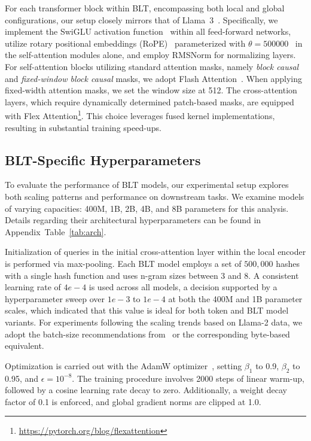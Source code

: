 For each transformer block within {\textsc BLT}, encompassing both local and global configurations, our setup closely mirrors that of Llama~3~\citep{dubey2024llama}. Specifically, we implement the SwiGLU activation function~\citep{swiglu} within all feed-forward networks, utilize rotary positional embeddings (RoPE)~\citep{RoPe} parameterized with $\theta=500000$~\citep{xiong2024effective} in the self-attention modules alone, and employ RMSNorm \citep{RMSNorm} for normalizing layers. For self-attention blocks utilizing standard attention masks, namely \textit{block causal} and \textit{fixed-window block causal} masks, we adopt Flash Attention~\citep{dao2022flashattention}. When applying fixed-width attention masks, we set the window size at 512. The cross-attention layers, which require dynamically determined patch-based masks, are equipped with Flex Attention\footnote{\url{https://pytorch.org/blog/flexattention}}. This choice leverages fused kernel implementations, resulting in substantial training speed-ups.

\subsection{{\textsc BLT}-Specific Hyperparameters}
To evaluate the performance of {\textsc BLT} models, our experimental setup explores both scaling patterns and performance on downstream tasks. We examine models of varying capacities: 400M, 1B, 2B, 4B, and 8B parameters for this analysis. Details regarding their architectural hyperparameters can be found in Appendix~Table~\ref{tab:arch}.

Initialization of queries in the initial cross-attention layer within the local encoder is performed via max-pooling. Each {\textsc BLT} model employs a set of $500,000$ hashes with a single hash function and uses n-gram sizes between 3 and 8. A consistent learning rate of $4e-4$ is used across all models, a decision supported by a hyperparameter sweep over $1e-3$ to $1e-4$ at both the 400M and 1B parameter scales, which indicated that this value is ideal for both token and {\textsc BLT} model variants. For experiments following the scaling trends based on Llama-2 data, we adopt the batch-size recommendations from~\cite{dubey2024llama} or the corresponding byte-based equivalent.

Optimization is carried out with the AdamW optimizer~\citep{adamw}, setting $\beta_1$ to 0.9, $\beta_2$ to 0.95, and $\epsilon=10^{-8}$. The training procedure involves 2000 steps of linear warm-up, followed by a cosine learning rate decay to zero. Additionally, a weight decay factor of 0.1 is enforced, and global gradient norms are clipped at 1.0.

